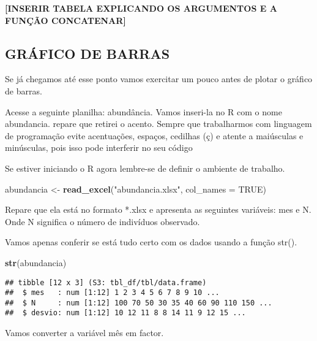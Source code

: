 \documentclass[]{book}
\newenvironment{Shaded}{\begin{snugshade}}{\end{snugshade}}
\newcommand{\DataTypeTok}[1]{\textcolor[rgb]{0.13,0.29,0.53}{#1}}
\newcommand{\KeywordTok}[1]{\textcolor[rgb]{0.13,0.29,0.53}{\textbf{#1}}}
\newcommand{\NormalTok}[1]{#1}
\newcommand{\OperatorTok}[1]{\textcolor[rgb]{0.81,0.36,0.00}{\textbf{#1}}}
\newcommand{\OtherTok}[1]{\textcolor[rgb]{0.56,0.35,0.01}{#1}}
\newcommand{\StringTok}[1]{\textcolor[rgb]{0.31,0.60,0.02}{#1}}
\begin{document}
\textbf{{[}INSERIR TABELA EXPLICANDO OS ARGUMENTOS E A FUNÇÃO CONCATENAR{]}}

\hypertarget{gruxe1fico-de-barras}{%
\subsection{GRÁFICO DE BARRAS}\label{gruxe1fico-de-barras}}

Se já chegamos até esse ponto vamos exercitar um pouco antes de plotar o gráfico de barras.

Acesse a seguinte planilha: abundância. Vamos inseri-la no R com o nome abundancia. repare que retirei o acento. Sempre que trabalharmos com linguagem de programação evite acentuações, espaços, cedilhas (ç) e atente a maiúsculas e minúsculas, pois isso pode interferir no seu código

Se estiver iniciando o R agora lembre-se de definir o ambiente de trabalho.

\begin{Shaded}
\begin{Highlighting}[]
\NormalTok{abundancia <-}\StringTok{ }\KeywordTok{read_excel}\NormalTok{(}\StringTok{"abundancia.xlsx"}\NormalTok{, }\DataTypeTok{col_names =} \OtherTok{TRUE}\NormalTok{)}
\end{Highlighting}
\end{Shaded}

Repare que ela está no formato *.xlsx e apresenta as seguintes variáveis: mes e N. Onde N significa o número de indivíduos observado.

Vamos apenas conferir se está tudo certo com os dados usando a função str().

\begin{Shaded}
\begin{Highlighting}[]
\KeywordTok{str}\NormalTok{(abundancia)}
\end{Highlighting}
\end{Shaded}

\begin{verbatim}
## tibble [12 x 3] (S3: tbl_df/tbl/data.frame)
##  $ mes   : num [1:12] 1 2 3 4 5 6 7 8 9 10 ...
##  $ N     : num [1:12] 100 70 50 30 35 40 60 90 110 150 ...
##  $ desvio: num [1:12] 10 12 11 8 8 14 11 9 12 15 ...
\end{verbatim}

Vamos converter a variável mês em factor.

\begin{Shaded}
\end{Shaded}
\end{document}
